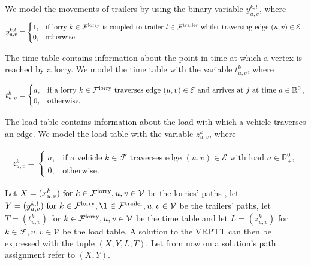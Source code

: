 We model the movements of trailers by using the binary variable
$y^{k,l}_{u,v} $, where
\begin{align}
  y^{k,l}_{u,v} =  \begin{cases}
  1 ,& \text{if lorry $k \in \mathcal F^{\rm lorry}$ is coupled to trailer $l \in \mathcal F^{\rm trailer} $ whilst traversing edge $(u,v) \in \mathcal E$ }, \\
  0,              & \text{otherwise. }
  \end{cases}
\end{align}


The time table contains information about the point in time at which a vertex is reached by a lorry.
We model the time table with the variable $t^k_{u,v}$, where


\begin{align}
  t^k_{u,v} =
  \begin{cases}
    a ,       & \text{if a lorry $k \in \mathcal F^{\rm lorry}$ traverses edge $(u,v) \in \mathcal E$ and arrives at $j$ at time $a \in \mathbb{R}^0_+$}, \\
    0,        & \text{otherwise. }
  \end{cases}
\end{align}


The load table contains information about the load with which a vehicle traverses an edge.
We model the load table with the variable $z^k_{u,v}$, where

\begin{align}
  z^k_{u,v} =
  \begin{cases}
    a ,       & \text{if a vehicle $k \in \mathcal F$ traverses edge $(u,v) \in  \mathcal E $ with load $a \in \mathbb{R}^0_+ $}, \\
    0,        & \text{otherwise. }
  \end{cases}
\end{align}


Let $ X = (x^k_{u,v}) \text{ for } k \in  \mathcal F^{\rm lorry}, u,v \in \mathcal V$
be the lorries' paths ,
let
$ Y = (y^{k,l}_{u,v}) \text{ for } k \in  \mathcal F^{\rm lorry} ,
\l  \in  \mathcal F^{\rm trailer}, u,v \in \mathcal V$
be the trailers' paths,
let
$ T = (t^k_{u,v}) $ for $ k \in  \mathcal F^{\rm lorry}, u,v \in \mathcal V$
be the time table and let
$ L = (z^k_{u,v}) $ for $ k \in  \mathcal F, u,v \in \mathcal V$
be the load table.
A solution to the VRPTT can then be expressed with the tuple $(X,Y,L,T)$.
Let from now on a solution's path assignment refer to
$(X,Y)$.\\

